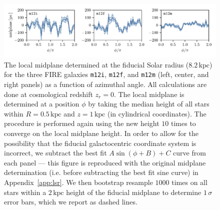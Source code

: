 \documentclass[twocolumn]{aastex62}
\newcommand{\kpc}{\text{kpc}}
\newcommand{\mi}{\texttt{m12i}}
\newcommand{\mf}{\texttt{m12f}}
\newcommand{\mm}{\texttt{m12m}}
\newcommand{\z}{z_r}
\begin{document}
\begin{figure}[htb!]
\begin{center}
\includegraphics[width=\textwidth]{fig/midplane_fit.pdf}
\end{center}
\caption{The local midplane determined at the fiducial Solar radius
($8.2\,\kpc$) for the three FIRE galaxies \mi{}, \mf{}, and \mm{} (left,
center, and right panels) as a function of azimuthal angle. All calculations
are done at cosmological redshift $\z =0$. The local midplane is determined at
a position $\phi$ by taking the median height of all stars within
$R=0.5\,\kpc$ and $z=1\,\kpc$ (in cylindrical coordinates). The procedure is
performed again using the new height $10$ times to converge on the local
midplane height. In order to allow for the possibility that the fiducial
galactocentric coordinate system is incorrect, we subtract the best fit
$A\sin{(\phi+B)}+C$ curve from each panel --- this figure is reproduced with
the original midplane determination (i.e. before subtracting the best fit sine
curve) in Appendix~\ref{app:lsr}. We then bootstrap resample $1000$ times on
all stars within a $2\,\kpc$ height of the fiducial midplane to determine
$1\,\sigma $ error bars, which we report as dashed lines.}
\label{fig:midplane}
\end{figure}
\end{document}
